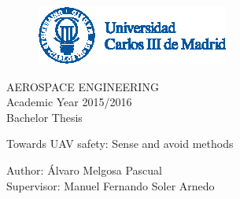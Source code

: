 \begin{titlepage}



\begin{center}



\begin{figure}[t!]
\begin{center}
\includegraphics[width=0.75\columnwidth]{../eps/logoUC3M.eps} 
\end{center}
\end{figure}
\vspace{5cm}
{\large AEROSPACE ENGINEERING}\\
\vspace{1cm}
Academic Year 2015/2016\\
Bachelor Thesis
\vspace{3cm}

{\Huge Towards UAV safety: Sense and avoid methods}\\

\vspace{8cm}




Author: Álvaro Melgosa Pascual\\
Supervisor: Manuel Fernando Soler Arnedo


\end{center}



\end{titlepage}

